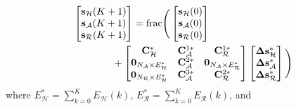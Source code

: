 \documentclass{IEEEtran}
\begin{document}
\begin{equation}\label{eqn_s_update_4}
	\begin{aligned}
		& \begin{bmatrix}
			\mathbf{s}_{\mathcal{H}}(K+1)\\
			\mathbf{s}_{\mathcal{A}}(K+1)\\
			\mathbf{s}_{\mathcal{R}}(K+1)
		\end{bmatrix}
		={\rm frac}\Bigg(
		\begin{bmatrix}
			\mathbf{s}_{\mathcal{H}}(0)\\
			\mathbf{s}_{\mathcal{A}}(0)\\
			\mathbf{s}_{\mathcal{R}}(0)
		\end{bmatrix}\\
		& \qquad \qquad +
		\begin{bmatrix}
			\mathbf{C}_{\mathcal{H}}^* & \mathbf{C}_{\mathcal{A}}^{1*} & \mathbf{C}_{\mathcal{R}}^{1*}\\
			\mathbf{0}_{N_{\mathcal{A}} \times E_{\mathcal{H}}^*} & \mathbf{C}_{\mathcal{A}}^{2*} & \mathbf{0}_{N_{\mathcal{A}} \times E_{\mathcal{R}}^*} \\
			\mathbf{0}_{N_{\mathcal{R}} \times E_{\mathcal{H}}^*} & \mathbf{C}_{\mathcal{A}}^{3*} & \mathbf{C}_{\mathcal{R}}^{2*}
		\end{bmatrix}
		\begin{bmatrix}
			\boldsymbol{\Delta}\mathbf{s}_{\mathcal{H}}^*\\
			\boldsymbol{\Delta}\mathbf{s}_{\mathcal{A}}^*\\
			\boldsymbol{\Delta}\mathbf{s}_{\mathcal{R}}^*
		\end{bmatrix}
		\Bigg)
	\end{aligned} 
\end{equation}
where $E_{\mathcal{H}}^*=\sum_{k=0}^{K}E_{\mathcal{H}}(k)$, $E_{\mathcal{R}}^*=\sum_{k=0}^{K}E_{\mathcal{R}}(k)$, and
\end{document}
